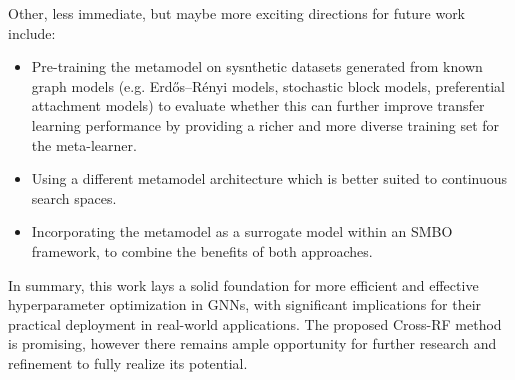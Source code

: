 Other, less immediate, but maybe more exciting directions for future work include:
\begin{itemize}
	\item Pre-training the metamodel on sysnthetic datasets generated from known graph models (e.g. Erdős–Rényi models, stochastic block models, preferential attachment models) to evaluate whether this can further improve transfer learning performance by providing a richer and more diverse training set for the meta-learner.
	\item Using a different metamodel architecture which is better suited to continuous search spaces.
	\item Incorporating the metamodel as a surrogate model within an SMBO framework, to combine the benefits of both approaches.
\end{itemize}

In summary, this work lays a solid foundation for more efficient and effective hyperparameter optimization in GNNs, with significant implications for their practical deployment in real-world applications. The proposed Cross-RF method is promising, however there remains ample opportunity for further research and refinement to fully realize its potential.
